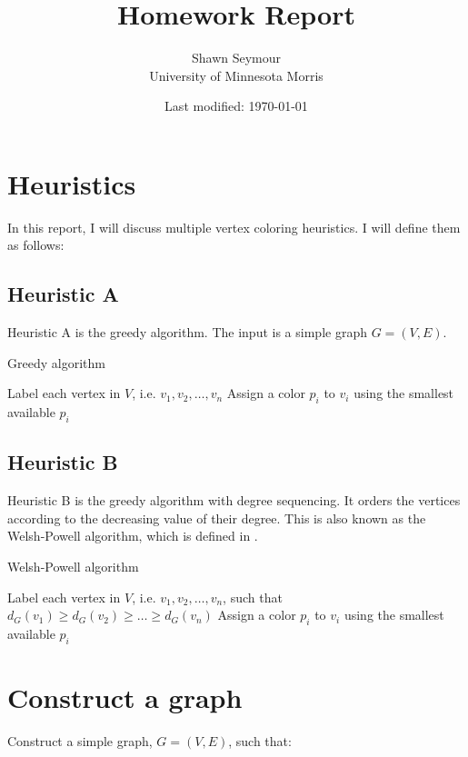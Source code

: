 \documentclass{article}
\title{Homework Report}
\date{Last modified: \today}
\author{Shawn Seymour\\ University of Minnesota Morris}
\begin{document}
\maketitle

\section*{Heuristics}
In this report, I will discuss multiple vertex coloring heuristics. I will define them as follows:

\subsection*{Heuristic A}

Heuristic A is the greedy algorithm. The input is a simple graph \(G = (V, E)\).

\begin{algorithm}
\caption{Greedy algorithm}
\begin{algorithmic}[1]
\State Label each vertex in $V$, i.e. $v_1, v_2, \dots, v_n$
\State Assign a color $p_i$ to $v_i$ using the smallest available $p_i$
\EndFor
\end{algorithmic}
\end{algorithm}

\subsection*{Heuristic B}

Heuristic B is the greedy algorithm with degree sequencing. It orders the vertices according to the decreasing value of their degree. This is also known as the Welsh-Powell algorithm, which is defined in \cite{welsh}.

\begin{algorithm}
\caption{Welsh-Powell algorithm}
\begin{algorithmic}[1]
\State Label each vertex in $V$, i.e. $v_1, v_2, \dots, v_n$, such that $d_G(v_1) \geq d_G(v_2) \geq \dots \geq d_G(v_n)$
\State Assign a color $p_i$ to $v_i$ using the smallest available $p_i$
\EndFor
\end{algorithmic}
\end{algorithm}

\section*{Construct a graph}
Construct a simple graph, \(G = (V, E)\), such that:
\end{document}
